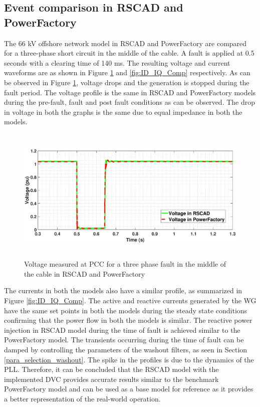 \subsection{Event comparison in RSCAD and PowerFactory}
The 66 kV offshore network model in RSCAD and PowerFactory are compared for a three-phase short circuit in the middle of the cable. A fault is applied at 0.5 seconds with a clearing time of 140 ms. The resulting voltage and current waveforms are as shown in Figure \ref{fig:VACP_comp} and \ref{fig:ID_IQ_Comp} respectively. As can be observed in Figure \ref{fig:VACP_comp}, voltage drops and the generation is stopped during the fault period. The voltage profile is the same in RSCAD and PowerFactory models during the pre-fault, fault and post fault conditions as can be observed. The drop in voltage in both the graphs is the same due to equal impedance in both the models. 

\begin{figure}[H]
\centering
    \includegraphics[height = 6.5cm,width = 14.5cm]{Diagrams/Chapter_3/VACP_Comp_New_3.eps}
    \caption{Voltage measured at PCC for a three phase fault in the middle of the cable in RSCAD and PowerFactory}
    \label{fig:VACP_comp}
\end{figure}


The currents in both the models also have a similar profile, as summarized in Figure \ref{fig:ID_IQ_Comp}. The active and reactive currents generated by the \gls{WG} have the same set points in both the models during the steady state conditions confirming that the power flow in both the models is similar. The reactive power injection in RSCAD model during the time of fault is achieved similar to the PowerFactory model. The transients occurring during the time of fault can be damped by controlling the parameters of the washout filters, as seen in Section \ref{para_selection_washout}. The spike in the profiles is due to the dynamics of the \gls{PLL}. Therefore, it can be concluded that the RSCAD model with the implemented \gls{DVC} provides accurate results similar to the benchmark PowerFactory model and can be used as a base model for reference as it provides a better representation of the real-world operation.  

